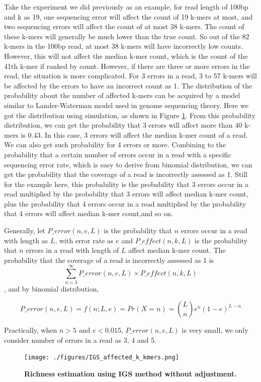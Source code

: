Take the experiment we did
previously as an example, for read length of 100bp and k as 19, one sequencing
error will affect the count of 19 k-mers at most, and two sequencing errors
will affect the count of at most 38 k-mers. The count of these k-mers will
generally be much lower than the true count. So out of the 82 k-mers
in the 100bp read, at most 38 k-mers will have incorrectly low counts. However, this
will not affect the median k-mer count, which is the count of the 41th k-mer if
ranked by count. However, if there are three or more errors in the read, the 
situation is more complicated. For 3 errors in a read, 3 to 57 k-mers
will be affected by the errors to have an incorrect count as 1. The 
distribution of the probability about the number of affected k-mers can be
acquired by a model similar to Lander-Waterman model used in genome sequencing
 theory. Here we got the distribution using simulation, as shown in Figure
\ref{fig:IGS_affected_k_kmers}. From this probability distribution, we can get
the probability that 3 errors will affect more than 40 k-mers is 0.43. In this
case, 3 errors will affect the median k-mer count of a read. We can also get 
such probability for 4 errors or more. Combining to the probability that a
certain number of errors occur in a read with a specific sequencing error rate,
which is easy to derive from binomial distribution, we can get the probability
that the coverage of a read is incorrectly assessed as 1. Still for the example
here, this probability is the probability that 3 errors occur in a read
multiplied by the probability that 3 errors will affect median k-mer count,
plus the probability that 4 errors occur in a read multiplied by the 
probability that 4 errors will affect median k-mer count,and so on.

Generally, let $P\_error(n,e,L)$ is the probability that $n$ errors occur in a 
read with length as $L$, with error rate as $e$ and $P\_effect(n,k,L)$ is the 
probability that $n$ 
errors in a read with length of $L$ affect median k-mer count. The probability 
that the coverage of a read is incorrectly assessed as 1 is 
\[\sum_{n=3}^{\infty} P\_error(n,e,L) \times P\_effect(n,k,L) \],
and by binomial distribution,

\[P\_error(n,e,L) = f(n;L,e) = Pr(X=n) = {L \choose n}e^n(1-e)^{L-n} \] 

Practically, when $n>5$ and $e<0.015$, $P\_error(n,e,L)$ is very small, we only consider
number of errors in a read as 3, 4 and 5.

\begin{figure}[!ht]
 \centerline{\texttt{[image: ./figures/IGS\_affected\_k\_kmers.png]}}
\caption{\bf Richness estimation using IGS method without adjustment. }
\label{fig:IGS_affected_k_kmers}
\end{figure}

